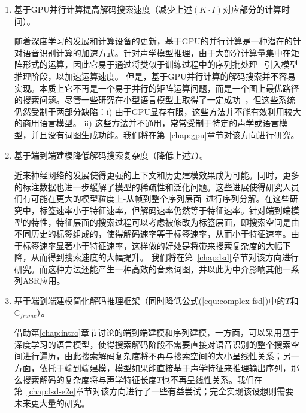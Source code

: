 \begin{enumerate}
\item 基于GPU并行计算提高解码搜索速度（减少上述$(K \cdot I)$对应部分的计算时间）。

随着深度学习的发展和计算设备的更新，基于GPU的并行计算是一种潜在的针对语音识别计算的加速方式。针对声学模型推理，由于大部分计算量集中在矩阵形式的运算，因此它易于通过将类似于训练过程中\cite{vesely2010parallel}的序列批处理~\cite{dixon2009harnessing} 引入模型推理阶段，以加速运算速度。
但是，基于GPU并行计算的解码搜索并不容易实现。本质上它不再是一个易于并行的矩阵运算问题，而是一个图上最优路径的搜索问题。尽管一些研究在小型语言模型上取得了一定成功~\cite{you2009parallel}，但这些系统仍然受制于两部分缺陷：i) 由于GPU显存有限，这些方法并不能有效利用较大的商用语言模型。
ii) 这些方法并不通用，常常受制于特定的声学或语言模型，并且没有词图生成功能。我们将在第~\ref{chap:gpu}章节对该方向进行研究。

\item 基于端到端建模降低解码搜索复杂度（降低上述$T$）。

近来神经网络的发展使得更强的上下文和历史建模效果成为可能\cite{sak2014long,qian2016very}。同时，更多的标注数据也进一步缓解了模型的稀疏性和泛化问题。这些进展使得研究人员们有可能在更大的模型粒度上-从帧到整个序列层面~\cite{amodei2015deep,soltau2016neural,collobert2016wav2letter,sak2015fast,chan2016end}进行序列分解。在这些研究中，标签速率小于特征速率，但解码速率仍然等于特征速率。针对端到端模型的特性，特征层面的搜索过程可以考虑被修改为标签层面，即搜索空间是由不同历史的标签组成的，使得解码速率等于标签速率，从而小于特征速率。由于标签速率显著小于特征速率，这样做的好处是将带来搜索复杂度的大幅下降，从而得到搜索速度的大幅提升。
我们将在第~\ref{chap:lsd}章节对该方向进行研究。而这种方法还能产生一种高效的音素词图，并以此为中介影响其他一系列ASR应用。

\item 基于端到端建模简化解码推理框架（同时降低公式(\ref{equ:complex-fsd})中的$T$和$\mathbb{C}_{frame}$）。

借助第\ref{chap:intro}章节讨论的端到端建模和序列建模，一方面，可以采用基于深度学习的语言模型，使得搜索解码阶段不需要直接对语音识别的整个搜索空间进行遍历，由此搜索解码复杂度将不再与搜索空间的大小呈线性关系；另一方面，依托于端到端建模，模型如果能直接基于声学特征来推理输出序列，那么搜索解码的复杂度将与声学特征长度$T$也不再呈线性关系。我们在第~\ref{chap:lsd-e2e}章节对该方向进行了一些有益尝试；完全实现该设想则需要未来更大量的研究。

\end{enumerate}
